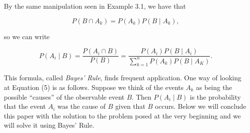 \documentclass{article}
\theoremstyle{definition}
\theoremstyle{remark}
\theoremstyle{definition}
\begin{document}
\noindent By the same manipulation seen in Example 3.1, we have that 

\begin{equation*}
    P(B\cap A_k)=P(A_k)P(B\mid A_k),
\end{equation*}

\noindent so we can write 

\begin{equation}
    P(A_i\mid B)=\frac{P(A_i\cap B)}{P(B)}=\frac{P(A_i)P(B\mid A_i)}{\sum_{k=1}^{n}P(A_k)P(B\mid A_K)}.
\end{equation}

This formula, called \textit{Bayes' Rule}, finds frequent application. One way of looking at Equation (5) is as follows. Suppose we think of the events $A_k$ as being the possible ``causes'' of the observable event $B$. Then $P(A_i\mid B)$ is the probability that the event $A_i$ was the cause of $B$ given that $B$ occurs. Below we will conclude this paper with the solution to the problem posed at the very beginning and we will solve it using Bayes' Rule.
\end{document}
